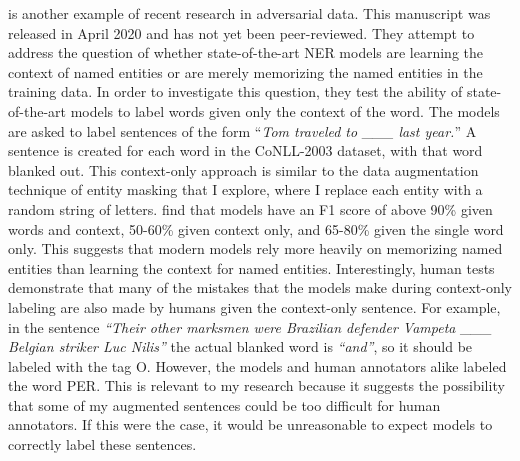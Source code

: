 \cite{interpretability} is another example of recent research in adversarial data. This manuscript was released in April 2020 and has not yet been peer-reviewed. They attempt to address the question of whether state-of-the-art NER models are learning the context of named entities or are merely memorizing the named entities in the training data. In order to investigate this question, they test the ability of state-of-the-art models to label words given only the context of the word. The models are asked to label sentences of the form ``\textit{Tom traveled to \_\_\_ last year.}'' A  sentence is created for each word in the CoNLL-2003 dataset, with that word blanked out. This context-only approach is similar to the data augmentation technique of entity masking that I explore, where I replace each entity with a random string of letters. \cite{interpretability} find that models have an F1 score of above 90\% given words and context, 50-60\% given context only, and 65-80\% given the single word only. This suggests that modern models rely more heavily on memorizing named entities than learning the context for named entities. Interestingly, human tests demonstrate that many of the mistakes that the models make during context-only labeling are also made by humans given the context-only sentence. For example, in the sentence \textit{``Their other marksmen were Brazilian defender Vampeta \_\_\_ Belgian striker Luc Nilis''} the actual blanked word is \textit{``and''}, so it should be labeled with the tag \textsc{O}. However, the models and human annotators alike labeled the word \textsc{PER}. This is relevant to my research because it suggests the possibility that some of my augmented sentences could be too difficult for human annotators. If this were the case, it would be unreasonable to expect models to correctly label these sentences.



